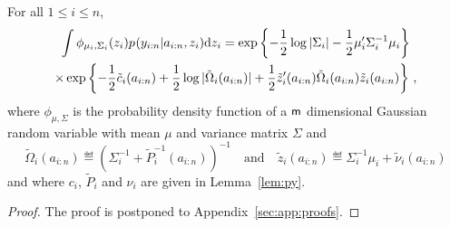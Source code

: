 \begin{lemma}
\label{lem:integral:gammap}
For all $1\le i\le n$,
\begin{multline*}
\int \phi_{\mu_i,\Sigma_i}(z_i)p_{}(y_{i:n}|a_{i:n},z_i)\mathrm{d} z_{i} = \exp\left\{-\frac{1}{2}\log |\Sigma_i| - \frac{1}{2}\mu_i'\Sigma^{-1}_i\mu_i\right\}\\
\times\exp\left\{-\frac{1}{2}\tilde{c}_{i}(a_{i:n})+\frac{1}{2}\log|\tilde{\Omega}_{i}(a_{i:n})| +\frac{1}{2}\tilde{z}'_i(a_{i:n})\tilde{\Omega}_{i}(a_{i:n})\tilde{z}_i(a_{i:n})\right\}\,,
\end{multline*}
where $\phi_{\mu,\Sigma}$ is the probability density function of a $\mathsf{m}$ dimensional Gaussian random variable with mean $\mu$ and variance matrix $\Sigma$ and
\[
\tilde{\Omega}_{i}(a_{i:n})\eqdef \left(\Sigma_i^{-1} + \tilde{P}_{i}^{-1}(a_{i:n})\right)^{-1}\quad\mbox{and}\quad
\tilde{z}_i(a_{i:n})\eqdef \Sigma_i^{-1}\mu_i+\tilde{\nu}_{i}(a_{i:n})
\]
and where $c_{i}$, $\tilde{P}_{i}$ and $\nu_{i}$ are given in Lemma~\ref{lem:py}.
\end{lemma}
\begin{proof}
The proof is postponed to Appendix~\ref{sec:app:proofs}.
\end{proof}


